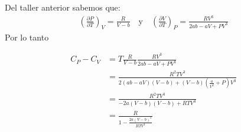 \documentclass[a4paper]{article}
\begin{document}
\begin{answer}[Punto 3]
    Del taller anterior sabemos que:
    \begin{align*}
        \left( \frac{\partial P}{\partial T} \right)_V = \frac{R}{V-b} \quad \text{y} \quad \left( \frac{\partial V} {\partial T}\right)_P  = \frac{RV^3}{2ab - aV + PV^3}
    \end{align*}
    Por lo tanto 

    \begin{align*}
        C_P - C_V &= T \frac{R}{V-b} \frac{RV^3}{2ab - aV + PV^3} \\
        &= \frac{R^2TV^3}{2(ab - aV)(V-b) +(V-b)\left(\frac a{V^2} + P\right)V^3}\\
        &= \frac{R^2TV^3}{-2a(V - b)(V-b) +RT V^3}\\
        &= \frac{R}{1 -\frac{2a(V- b)^2}{RTV^3}}\\
    \end{align*}
    \end{answer}
    
\end{document}
